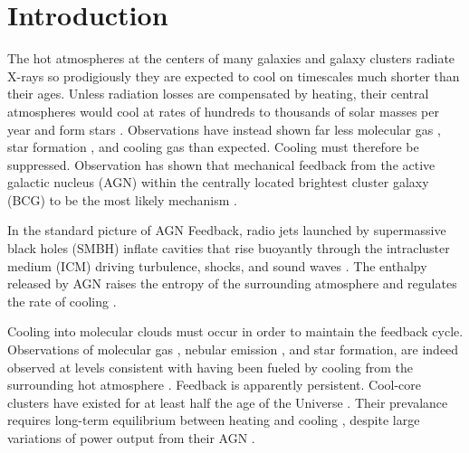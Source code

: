 \documentclass[twocolumn]{aastex6}
\begin{document}


\section{Introduction} \label{Section:Introduction}

The hot atmospheres at the centers of many galaxies and galaxy clusters radiate X-rays so prodigiously they are expected to cool on timescales much shorter than their ages.  Unless radiation losses are compensated by heating, their central atmospheres would cool at rates of hundreds to thousands of solar masses per year and form stars \cite[for a review see][]{Fabian94}.  Observations have instead shown far less molecular gas \cite[][]{Edge01,Salome03}, star formation  \cite[][]{Johnstone87,O'Dea08,Rafferty08}, and cooling gas \cite[][]{Peterson03,Borgani06,Nagai07,Sanders11} than expected.  Cooling must therefore be suppressed.  Observation has shown that mechanical feedback from the active galactic nucleus (AGN) within the centrally located brightest cluster galaxy (BCG) to be the most likely mechanism \cite[][]{McNamara07}.

In the standard picture of AGN Feedback, radio jets launched by supermassive black holes (SMBH) inflate cavities that rise buoyantly through the intracluster medium (ICM) driving turbulence, shocks, and sound waves \cite[][]{Fabian05,Voit05b,Randall11,Nulsen13,Zhuravleva14,Hillel16a,Hillel16b,Soker16,Yang16a}.  The enthalpy released by AGN raises the entropy of the surrounding atmosphere and regulates the rate of cooling \cite[for reviews see][]{McNamara07,McNamara12,Fabian12}.  

Cooling into molecular clouds must occur in order to maintain the feedback cycle.  Observations of molecular gas \cite[][]{Edge01,Salome03}, nebular emission \cite[e.g.][]{Heckman89,Crawford99,McDonald10,Tremblay15}, and star formation, are indeed observed at levels consistent with having been fueled by cooling from the surrounding hot atmosphere \cite[][]{McNamara14,Russell17}.   Feedback is apparently persistent.   Cool-core clusters have existed for at least half the age of the Universe \cite[e.g.][]{Santos10,Samuele11,Ma11,McDonald13,Hlavacek-Larrondo15,Main17}.  Their prevalance requires long-term equilibrium between heating and cooling \cite[e.g.][]{Hlavacek-Larrondo12, Main17}, despite large variations of power output from their AGN \cite[][]{Hogan15b}.
\end{document}
